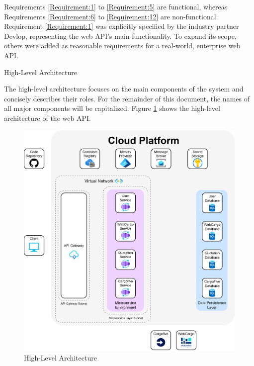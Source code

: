 \documentclass[12pt, reqno, oneside]{amsbook}
\makeatletter
\def\section{\@startsection{section}{1}%
      \z@{.5\linespacing\@plus.7\linespacing}{.25\linespacing}%
      {\normalfont\bfseries\flushleft}}
\theoremstyle{definition}
\theoremstyle{definition}
\numberwithin{section}{chapter}
\numberwithin{table}{chapter}
\numberwithin{figure}{chapter}
\makeatother
\begin{document}
Requirements \ref{Requirement:1} to \ref{Requirement:5} are functional, whereas Requirements \ref{Requirement:6} to \ref{Requirement:12} are non-functional. Requirement \ref{Requirement:1} was explicitly specified by the industry partner Devlop, representing the web \ac{API}'s main functionality. To expand its scope, others were added as reasonable requirements for a real-world, enterprise web \ac{API}.

\pagebreak

\section{High-Level Architecture}
\label{Section:High_Level_Architecture}

The high-level architecture focuses on the main components of the system and concisely describes their roles. For the remainder of this document, the names of all major components will be capitalized. Figure \ref{Figure:High_Level_Architecture} shows the high-level architecture of the web \ac{API}.

\begin{figure}[H]
  \centering
  \includegraphics[width=1\linewidth]{images/HighLevelArchitecture.png}
  \caption{\label{Figure:High_Level_Architecture}High-Level Architecture}
\end{figure}
\end{document}
